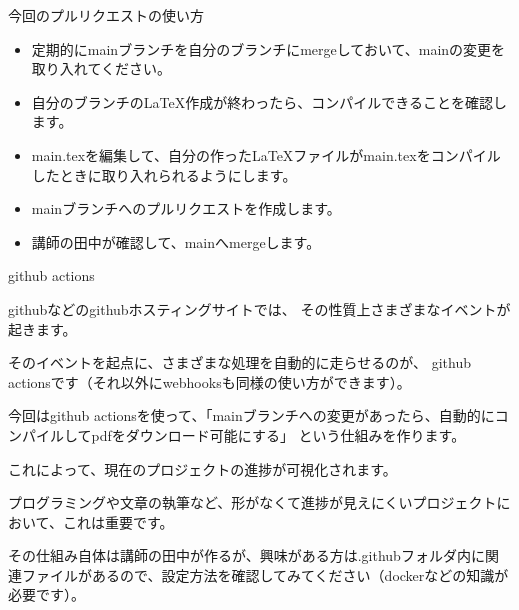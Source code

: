 \documentclass[12pt, unicode]{beamer}
\begin{document}
\begin{frame}{今回のプルリクエストの使い方}

\begin{itemize}
\item 定期的にmainブランチを自分のブランチにmergeしておいて、mainの変更を取り入れてください。
\item 自分のブランチのLaTeX作成が終わったら、コンパイルできることを確認します。
\item main.texを編集して、自分の作ったLaTeXファイルがmain.texをコンパイルしたときに取り入れられるようにします。
\item mainブランチへのプルリクエストを作成します。
\item 講師の田中が確認して、mainへmergeします。
\end{itemize}

\end{frame}
\begin{frame}{github actions}

githubなどのgithubホスティングサイトでは、
その性質上さまざまなイベントが起きます。

そのイベントを起点に、さまざまな処理を自動的に走らせるのが、
github actionsです（それ以外にwebhooksも同様の使い方ができます）。

今回はgithub actionsを使って、「mainブランチへの変更があったら、自動的にコンパイルしてpdfをダウンロード可能にする」
という仕組みを作ります。

これによって、現在のプロジェクトの進捗が可視化されます。

プログラミングや文章の執筆など、形がなくて進捗が見えにくいプロジェクトにおいて、これは重要です。

その仕組み自体は講師の田中が作るが、興味がある方は.githubフォルダ内に関連ファイルがあるので、設定方法を確認してみてください（dockerなどの知識が必要です）。

\end{frame}
\end{document}
